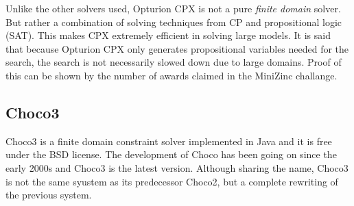 Unlike the other solvers used, Opturion CPX is not a pure \emph{finite domain} solver. But rather a combination of solving techniques from CP and propositional logic (SAT). This makes CPX extremely efficient in solving large models.
It is said that because Opturion CPX only generates propositional variables needed for the search, the search is not necessarily slowed down due to large domains.
Proof of this can be shown by the number of awards claimed in the MiniZinc challange.
\cite{cpx}
\cite{cpx_about}
\cite{cpx_site}
\subsection{Choco3}
Choco3 is a finite domain\cite{choco_paper} constraint solver implemented in Java and it is free under the BSD license. The development of Choco has been going on since the early 2000s and Choco3 is the latest version. Although sharing the name, Choco3 is not the same syustem as its predecessor Choco2, but a complete rewriting of the previous system.
\cite{choco}